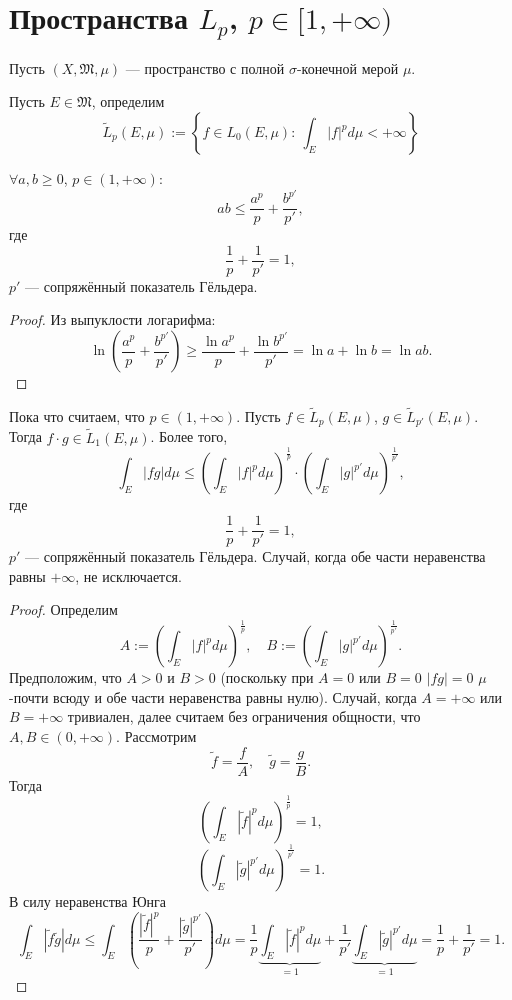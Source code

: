 \section{Пространства $L_p$, $p \in [1, +\infty)$}
Пусть $(X, \mathfrak{M}, \mu)$ — пространство с полной $\sigma$-конечной мерой $\mu$.
\begin{definition}
    Пусть $E \in \mathfrak{M}$, определим 
    \[\widetilde{L}_p(E, \mu) := \left\{f \in L_0(E,\mu): \ \int_E|f|^p d\mu < +\infty \right\}\]
\end{definition} 

\begin{lemma}
    $\forall a, b \geqslant 0$, $p \in (1, +\infty)$:
    \[ab \leqslant \frac{a^p}{p} + \frac{b^{p'}}{p'},\]
    где
    \[\frac{1}{p} + \frac{1}{p'} = 1,\]
    $p'$ — сопряжённый показатель Гёльдера.
\end{lemma} 
\begin{proof}
    Из выпуклости логарифма:
    \[\ln \left(\frac{a^p}{p} + \frac{b^{p'}}{p'}\right) \geqslant \frac{\ln a^p}{p} + \frac{\ln b^{p'}}{p'} = \ln a + \ln b = \ln ab.\]
\end{proof} 

\begin{theorem}
    Пока что считаем, что $p \in (1, +\infty)$. Пусть $f \in \widetilde{L}_p(E, \mu)$, $g \in \widetilde{L}_{p'}(E,\mu)$.
    Тогда $f \cdot g \in \widetilde{L}_1(E,\mu)$. Более того,
    \[\int_E |fg| d\mu \leqslant \left(\int_E |f|^p d\mu\right)^{\frac{1}{p}} \cdot \left(\int_E |g|^{p'} d\mu\right)^{\frac{1}{p'}},\]
    где
    \[\frac{1}{p} + \frac{1}{p'} = 1,\]
    $p'$ — сопряжённый показатель Гёльдера.
    Случай, когда обе части неравенства равны $+\infty$, не исключается.
\end{theorem} 
\begin{proof}
    Определим
    \[A:= \left(\int_E |f|^p d\mu\right)^{\frac{1}{p}}, \quad B := \left(\int_E |g|^{p'} d\mu\right)^{\frac{1}{p'}}.\]
    Предположим, что $A>0$ и $B>0$ (поскольку при $A=0$ или $B=0$ $|fg|=0$ $\mu$-почти всюду и обе части неравенства равны нулю).
    Случай, когда $A = +\infty$ или $B = +\infty$ тривиален, далее считаем без ограничения общности, что $A,B \in (0, +\infty)$.
    Рассмотрим
    \[\widetilde{f} = \frac{f}{A}, \quad \widetilde{g} = \frac{g}{B}.\]
    Тогда
    \[\left(\int_E |\widetilde{f}|^p d\mu\right)^{\frac{1}{p}} = 1,\]
    \[\left(\int_E |\widetilde{g}|^{p'} d\mu\right)^{\frac{1}{p'}} = 1.\]
    В силу неравенства Юнга
    \[\int_E |\widetilde{f} \widetilde{g}| d\mu \leqslant \int_E \left(\frac{|\widetilde{f}|^p}{p} + \frac{|\widetilde{g}|^{p'}}{p'}\right) d\mu = \frac{1}{p} \underbrace{\int_E |\widetilde{f}|^p d\mu}_{=1} + \frac{1}{p'} \underbrace{\int_E |\widetilde{g}|^{p'} d\mu}_{=1} = \frac{1}{p} + \frac{1}{p'} = 1.\]
\end{proof} 


